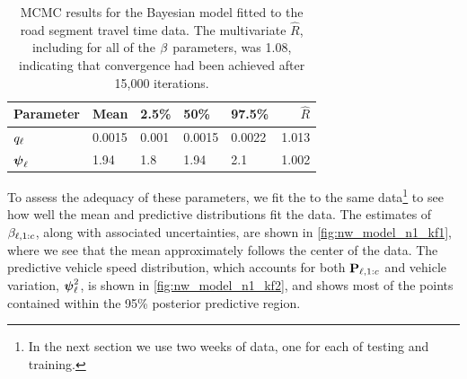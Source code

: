 \begin{table}

\caption[MCMC results for the Bayesian model fitted to the road segment travel time data]{\label{tab:nw_model_fit_smry}MCMC results for the Bayesian model fitted to the road segment travel time data. The multivariate $\hat R$, including for all of the $\beta$ parameters, was 1.08, indicating that convergence had been achieved after 15,000 iterations.}
\centering
\begin{tabular}[b]{lllllr}
\toprule
Parameter & Mean & 2.5\% & 50\% & 97.5\% & $\hat R$\\
\midrule
$q_\ell$ & 0.0015 & 0.001 & 0.0015 & 0.0022 & 1.013\\
$\mathbf{\boldsymbol{\psi}}_\ell$ & 1.94 & 1.8 & 1.94 & 2.1 & 1.002\\
\bottomrule
\end{tabular}
\end{table}



To assess the adequacy of these parameters, we fit the \kf{} to the same data\footnote{In the next section we use two weeks of data, one for each of testing and training.} to see how well the mean and predictive distributions fit the data. The estimates of $\beta_{\ell,1:c}$, along with associated uncertainties, are shown in \cref{fig:nw_model_n1_kf1}, where we see that the mean approximately follows the center of the data. The predictive vehicle speed distribution, which accounts for both $\mathbf{P}_{\ell,1:c}$ and vehicle variation, $\mathbf{\boldsymbol{\psi}}_{\ell}^2$, is shown in \cref{fig:nw_model_n1_kf2}, and shows most of the points contained within the 95\% posterior predictive region.


